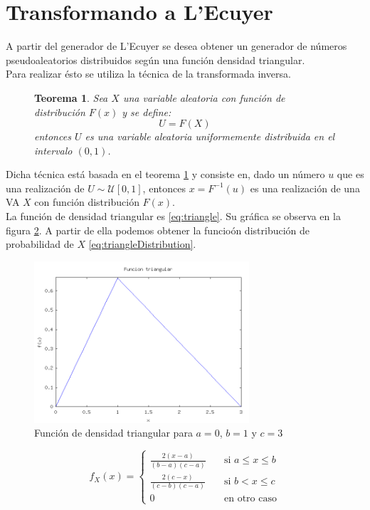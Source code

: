 \documentclass{sig-alternate}
\newtheorem{theorem}{Teorema}
\begin{document}
\section{Transformando a L'Ecuyer}
\label{sec:triangle}

A partir del generador de L'Ecuyer se desea obtener un generador de n\'umeros
pseudoaleatorios distribuidos seg\'un una funci\'on densidad triangular.\\
Para realizar \'esto se utiliza la t\'ecnica de la transformada inversa.

\begin{figure}[ht]
\begin{theorem}
\label{theo:1}
Sea $X$ una variable aleatoria con funci\'on de distribuci\'on $F(x)$
y se define:
$$U=F(X)$$
entonces $U$ es una variable aleatoria uniformemente distribuida en el intervalo $(0,1)$.
\end{theorem}
\end{figure}

Dicha t\'ecnica est\'a basada en el teorema \ref{theo:1} y consiste
en, dado un n\'umero $u$ que es una realizaci\'on de $U\sim\mathcal{U}[0,1]$,
entonces $x = F^{-1}(u)$ es una realizaci\'on de una VA $X$ con funci\'on
distribuci\'on $F(x)$.\\

La funci\'on de densidad triangular es \eqref{eq:triangle}. Su gr\'afica se observa
en la figura \ref{fig:triangle_fun}. A partir de ella podemos obtener
la funcio\'on distribuci\'on de probabilidad de $X$
\eqref{eq:triangleDistribution}.


\begin{figure}[ht]
\label{fig:triangle_fun}
\includegraphics[width=8cm]{triangular}
\caption{Funci\'on de densidad triangular para $a=0$, $b=1$ y $c=3$}
\end{figure}


\begin{equation}
\label{eq:triangle}
f_{X}(x) =
\begin{cases}
\frac{2(x-a)}{(b-a)(c-a)} \quad & \text{si } a \leq x \leq b \\
\frac{2(c-x)}{(c-b)(c-a)} \quad & \text{si } b < x \leq c \\
0 \quad & \text{en otro caso}
\end{cases}
\end{equation}
\end{document}
